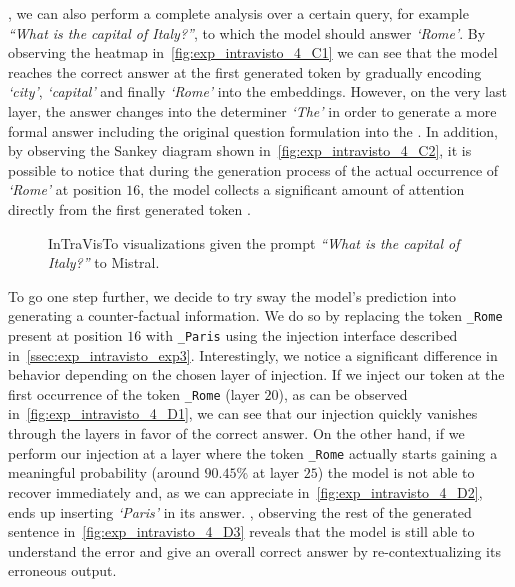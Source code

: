 , we can also perform a complete analysis over a certain query, for example \emph{``What is the capital of Italy?''}, to which the model should answer \emph{`Rome'}.
By observing the heatmap in~\cref{fig:exp_intravisto_4_C1} we can see that the model reaches the correct answer at the first generated token by gradually encoding \emph{`city'}, \emph{`capital'} and finally \emph{`Rome'} into the embeddings.
However, on the very last layer, the answer changes into the determiner \emph{`The'} in order to generate a more formal answer including the original question formulation into the .
In addition, by observing the Sankey diagram shown in~\cref{fig:exp_intravisto_4_C2}, it is possible to notice that during the generation process of the actual occurrence of \emph{`Rome'} at position $16$, the model collects a significant amount of attention directly from the first generated token .

\begin{figure}[tp!]
    \centering
    \quad
    \caption{InTraVisTo visualizations given the prompt \emph{``What is the capital of Italy?''} to Mistral.}
    \label{fig:exp_intravisto_4_C}
\end{figure}

To go one step further, we decide to try  sway the model's prediction into generating a counter-factual information.
We do so by replacing the token \texttt{\_Rome} present at position $16$ with \texttt{\_Paris} using the injection interface described in~\cref{ssec:exp_intravisto_exp3}.
Interestingly, we notice a significant difference in behavior depending on the chosen layer of injection.
If we inject our token at the first occurrence of the token \texttt{\_Rome} (layer $20$), as can be observed in~\cref{fig:exp_intravisto_4_D1}, we can see that our injection quickly vanishes through the layers in favor of the correct answer.
On the other hand, if we perform our injection at a layer where the token \texttt{\_Rome} actually starts gaining a meaningful probability (around $90.45\%$ at layer $25$) the model is not able to recover immediately and, as we can appreciate in~\cref{fig:exp_intravisto_4_D2}, ends up inserting \emph{`Paris'} in its answer.
, observing the rest of the generated sentence in~\cref{fig:exp_intravisto_4_D3} reveals that the model is still able to understand the  error and give an overall correct answer by re-contextualizing its erroneous output.

